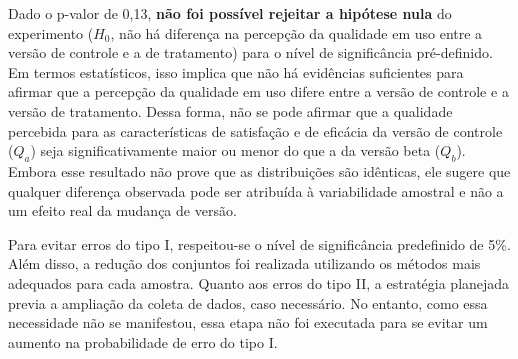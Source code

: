 Dado o p-valor de 0,13, \textbf{não foi possível rejeitar a hipótese nula} do experimento (\(H_0\), não há diferença na percepção da qualidade em uso entre a versão de controle e a de tratamento) para o nível de significância pré-definido. Em termos estatísticos, isso implica que não há evidências suficientes para afirmar que a percepção da qualidade em uso difere entre a versão de controle e a versão de tratamento. Dessa forma, não se pode afirmar que a qualidade percebida para as características de satisfação e de eficácia da versão de controle (\(Q_a\)) seja significativamente maior ou menor do que a da versão beta (\(Q_b\)). Embora esse resultado não prove que as distribuições são idênticas, ele sugere que qualquer diferença observada pode ser atribuída à variabilidade amostral e não a um efeito real da mudança de versão.


Para evitar erros do tipo I, respeitou-se o nível de significância predefinido de 5\%. Além disso, a redução dos conjuntos foi realizada utilizando os métodos mais adequados para cada amostra. Quanto aos erros do tipo II, a estratégia planejada previa a ampliação da coleta de dados, caso necessário. No entanto, como essa necessidade não se manifestou, essa etapa não foi executada para se evitar um aumento na probabilidade de erro do tipo I.  
